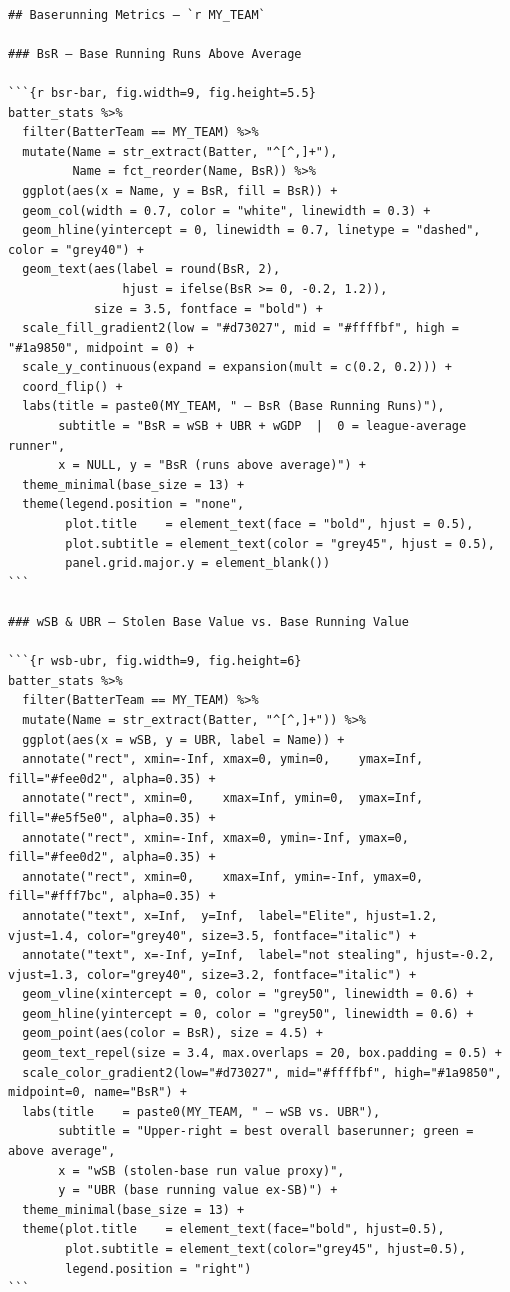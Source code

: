 \documentclass[
]{article}
\begin{document}
\begin{verbatim}

## Baserunning Metrics — `r MY_TEAM`

### BsR — Base Running Runs Above Average

```{r bsr-bar, fig.width=9, fig.height=5.5}
batter_stats %>%
  filter(BatterTeam == MY_TEAM) %>%
  mutate(Name = str_extract(Batter, "^[^,]+"),
         Name = fct_reorder(Name, BsR)) %>%
  ggplot(aes(x = Name, y = BsR, fill = BsR)) +
  geom_col(width = 0.7, color = "white", linewidth = 0.3) +
  geom_hline(yintercept = 0, linewidth = 0.7, linetype = "dashed", color = "grey40") +
  geom_text(aes(label = round(BsR, 2),
                hjust = ifelse(BsR >= 0, -0.2, 1.2)),
            size = 3.5, fontface = "bold") +
  scale_fill_gradient2(low = "#d73027", mid = "#ffffbf", high = "#1a9850", midpoint = 0) +
  scale_y_continuous(expand = expansion(mult = c(0.2, 0.2))) +
  coord_flip() +
  labs(title = paste0(MY_TEAM, " — BsR (Base Running Runs)"),
       subtitle = "BsR = wSB + UBR + wGDP  |  0 = league-average runner",
       x = NULL, y = "BsR (runs above average)") +
  theme_minimal(base_size = 13) +
  theme(legend.position = "none",
        plot.title    = element_text(face = "bold", hjust = 0.5),
        plot.subtitle = element_text(color = "grey45", hjust = 0.5),
        panel.grid.major.y = element_blank())
```

### wSB & UBR — Stolen Base Value vs. Base Running Value

```{r wsb-ubr, fig.width=9, fig.height=6}
batter_stats %>%
  filter(BatterTeam == MY_TEAM) %>%
  mutate(Name = str_extract(Batter, "^[^,]+")) %>%
  ggplot(aes(x = wSB, y = UBR, label = Name)) +
  annotate("rect", xmin=-Inf, xmax=0, ymin=0,    ymax=Inf,  fill="#fee0d2", alpha=0.35) +
  annotate("rect", xmin=0,    xmax=Inf, ymin=0,  ymax=Inf,  fill="#e5f5e0", alpha=0.35) +
  annotate("rect", xmin=-Inf, xmax=0, ymin=-Inf, ymax=0,    fill="#fee0d2", alpha=0.35) +
  annotate("rect", xmin=0,    xmax=Inf, ymin=-Inf, ymax=0,  fill="#fff7bc", alpha=0.35) +
  annotate("text", x=Inf,  y=Inf,  label="Elite", hjust=1.2, vjust=1.4, color="grey40", size=3.5, fontface="italic") +
  annotate("text", x=-Inf, y=Inf,  label="not stealing", hjust=-0.2, vjust=1.3, color="grey40", size=3.2, fontface="italic") +
  geom_vline(xintercept = 0, color = "grey50", linewidth = 0.6) +
  geom_hline(yintercept = 0, color = "grey50", linewidth = 0.6) +
  geom_point(aes(color = BsR), size = 4.5) +
  geom_text_repel(size = 3.4, max.overlaps = 20, box.padding = 0.5) +
  scale_color_gradient2(low="#d73027", mid="#ffffbf", high="#1a9850", midpoint=0, name="BsR") +
  labs(title    = paste0(MY_TEAM, " — wSB vs. UBR"),
       subtitle = "Upper-right = best overall baserunner; green = above average",
       x = "wSB (stolen-base run value proxy)",
       y = "UBR (base running value ex-SB)") +
  theme_minimal(base_size = 13) +
  theme(plot.title    = element_text(face="bold", hjust=0.5),
        plot.subtitle = element_text(color="grey45", hjust=0.5),
        legend.position = "right")
```


\end{verbatim}
\end{document}
